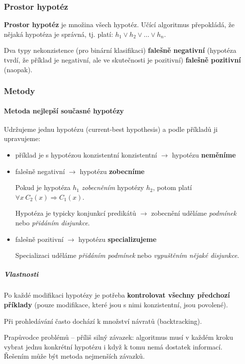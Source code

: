 \documentclass[11pt]{report} %
\numberwithin{equation}{section}
\begin{document}
\subsubsection{Prostor hypotéz}
\textbf{Prostor hypotéz} je množina všech hypotéz. Učící algoritmus přepokládá, že nějaká hypotéza je správná, tj. platí: $h_1 \vee h_2 \vee \dots \vee h_n$. 

Dva typy nekonzistence (pro binární klasifikaci) \textbf{falešně negativní} (hypotéza tvrdí, že příklad je negativní, ale ve skutečnosti je pozitivní) \textbf{falešně pozitivní} (naopak).

\subsubsection{Metody}
\paragraph{Metoda nejlepší současné hypotézy}
Udržujeme jednu hypotézu (current-best hypothesis) a podle příkladů ji upravujeme:
\begin{itemize}
\item příklad je s hypotézou konzistentní konzistentní $\to$ hypotézu \textbf{neměníme}
\item falešně negativní $\to$ hypotézu \textbf{zobecníme}

Pokud je hypotéza $h_1$ \textit{zobecněním} hypotézy $h_2$, potom platí $\forall x \ C_2(x) \Rightarrow C_1(x)$.

Hypotéza je typicky konjunkcí predikátů $\to$ zobecnění uděláme \textit{ podmínek} nebo \textit{přidáním disjunkce}.

\item falešně pozitivní $\to$ hypotézu \textbf{specializujeme}

Specializaci uděláme \textit{přidáním podmínek} nebo \textit{vypuštěním nějaké disjunkce}.
\end{itemize}


\subparagraph{Vlastnosti}
Po každé modifikaci hypotézy je potřeba \textbf{kontrolovat všechny předchozí příklady} (pouze modifikace, které jsou s nimi konzistentní, jsou povolené).

Při prohledávání často dochází k množství návratů (backtracking).

Prapůvodce problémů – příliš silný závazek: algoritmus musí v každém kroku vybrat jednu konkrétní hypotézu i když k tomu nemá dostatek informací. Řešením může být metoda nejmenších závazků.
\end{document}
